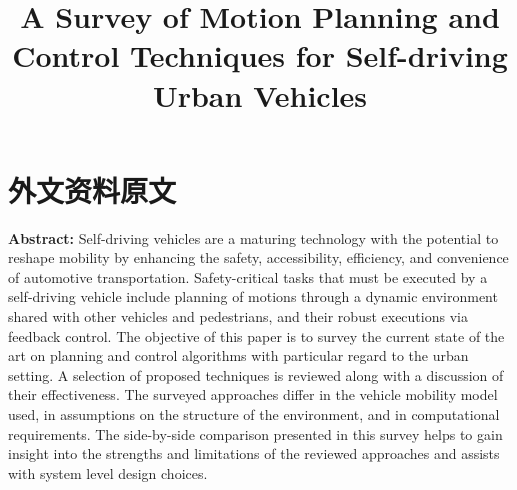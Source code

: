 \chapter{外文资料原文}
\label{cha:engorg}

\title{A Survey of Motion Planning and Control Techniques for Self-driving Urban Vehicles}

\textbf{Abstract:} Self-driving vehicles are a maturing technology with the potential to reshape mobility by enhancing the safety, accessibility, efficiency, and convenience of automotive transportation. Safety-critical tasks that must be executed by a self-driving vehicle include planning of motions through a dynamic environment shared with other vehicles and pedestrians, and their robust executions via feedback control. The objective of this paper is to survey the current state of the art on planning and control algorithms with particular regard to the urban setting. A selection of proposed techniques is reviewed along with a discussion of their effectiveness. The surveyed approaches differ in the vehicle mobility model used, in assumptions on the structure of the environment, and in computational requirements. The side-by-side comparison presented in this survey helps to gain insight into the strengths and limitations of the reviewed approaches and assists with system level design choices.

